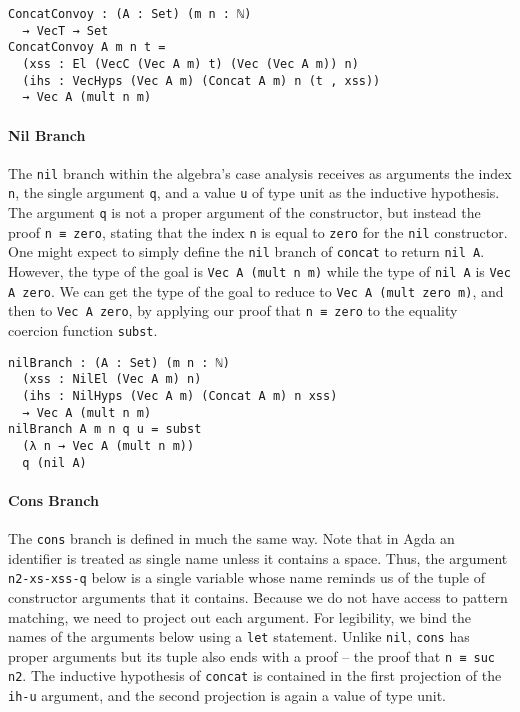 \documentclass[preprint,nonatbib]{sigplanconf}
\begin{document}
\begin{verbatim}
ConcatConvoy : (A : Set) (m n : ℕ)
  → VecT → Set
ConcatConvoy A m n t =
  (xss : El (VecC (Vec A m) t) (Vec (Vec A m)) n)
  (ihs : VecHyps (Vec A m) (Concat A m) n (t , xss))
  → Vec A (mult n m)
\end{verbatim}

\paragraph{Nil Branch}

The {\tt nil} branch within the algebra's case analysis receives as
arguments the index {\tt n}, the single argument {\tt q}, and a value
{\tt u} of type unit as the inductive hypothesis. The argument
{\tt q} is not a proper argument of the constructor, but instead the
proof {\tt n ≡ zero}, stating that the index {\tt n} is equal to
{\tt zero} for the {\tt nil} constructor. One might expect to simply
define the {\tt nil} branch of {\tt concat} to return {\tt nil A}.
However, the type of the goal is {\tt Vec A (mult n m)} while the type
of {\tt nil A} is {\tt Vec A zero}. We can get the type of the goal to
reduce to {\tt Vec A (mult zero m)}, and then to {\tt Vec A zero}, by
applying our proof that {\tt n ≡ zero} to the equality coercion
function {\tt subst}.

\begin{verbatim}
nilBranch : (A : Set) (m n : ℕ)
  (xss : NilEl (Vec A m) n)
  (ihs : NilHyps (Vec A m) (Concat A m) n xss)
  → Vec A (mult n m)
nilBranch A m n q u = subst
  (λ n → Vec A (mult n m))
  q (nil A)
\end{verbatim}

\paragraph{Cons Branch}

The {\tt cons} branch is defined in much the same way. Note
that in {\sc Agda} an identifier is treated as single name unless it
contains a space. Thus, the argument {\tt n2-xs-xss-q} below is a
single variable whose name reminds us of the tuple of constructor
arguments that it contains. Because we do not have access to pattern
matching, we need to project out each argument. For legibility, we
bind the names of the arguments below using a {\tt let} statement.
Unlike {\tt nil}, {\tt cons} has proper arguments but its tuple also
ends with a proof -- the proof that {\tt n ≡ suc n2}. The inductive
hypothesis of {\tt concat} is contained in the first projection of the
{\tt ih-u} argument, and the second projection is again a value of
type unit.
\end{document}
